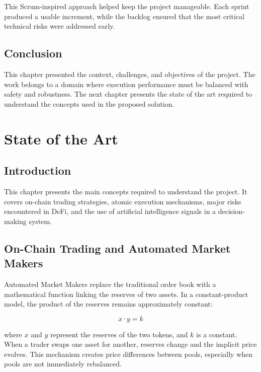 \documentclass[12pt,a4paper]{report}
\begin{document}
This Scrum-inspired approach helped keep the project manageable. Each sprint produced a usable increment, while the backlog ensured that the most critical technical risks were addressed early.

\section{Conclusion}

This chapter presented the context, challenges, and objectives of the project. The work belongs to a domain where execution performance must be balanced with safety and robustness. The next chapter presents the state of the art required to understand the concepts used in the proposed solution.

\chapter{State of the Art}
\label{chap:state_of_art}

\section{Introduction}

This chapter presents the main concepts required to understand the project. It covers on-chain trading strategies, atomic execution mechanisms, major risks encountered in DeFi, and the use of artificial intelligence signals in a decision-making system.

\section{On-Chain Trading and Automated Market Makers}

Automated Market Makers replace the traditional order book with a mathematical function linking the reserves of two assets. In a constant-product model, the product of the reserves remains approximately constant:

\begin{equation}
    x \cdot y = k
\end{equation}

where $x$ and $y$ represent the reserves of the two tokens, and $k$ is a constant. When a trader swaps one asset for another, reserves change and the implicit price evolves. This mechanism creates price differences between pools, especially when pools are not immediately rebalanced.
\end{document}

